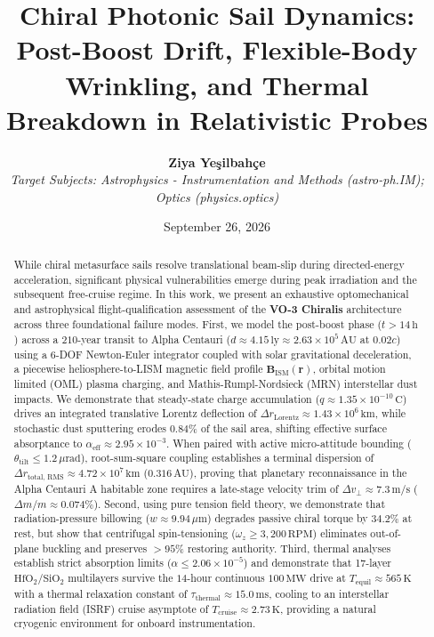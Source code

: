 \documentclass[11pt, a4paper]{article}
\title{\textbf{\LARGE Chiral Photonic Sail Dynamics: Post-Boost Drift, Flexible-Body Wrinkling, and Thermal Breakdown in Relativistic Probes}}
\author{\textbf{Ziya Ye\c{s}ilbah\c{c}e} \\
\textit{Target Subjects: Astrophysics - Instrumentation and Methods (astro-ph.IM); Optics (physics.optics)}}
\date{September 26, 2026}
\begin{document}
\maketitle

\begin{abstract}
While chiral metasurface sails resolve translational beam-slip during directed-energy acceleration, significant physical vulnerabilities emerge during peak irradiation and the subsequent free-cruise regime. In this work, we present an exhaustive optomechanical and astrophysical flight-qualification assessment of the \textbf{VO-3 Chiralis} architecture across three foundational failure modes. First, we model the post-boost phase ($t > 14\,\text{h}$) across a $210$-year transit to Alpha Centauri ($d \approx 4.15\,\text{ly} \approx 2.63 \times 10^5\,\text{AU}$ at $0.02c$) using a 6-DOF Newton-Euler integrator coupled with solar gravitational deceleration, a piecewise heliosphere-to-LISM magnetic field profile $\mathbf{B}_{\text{ISM}}(\mathbf{r})$, orbital motion limited (OML) plasma charging, and Mathis-Rumpl-Nordsieck (MRN) interstellar dust impacts. We demonstrate that steady-state charge accumulation ($q \approx 1.35 \times 10^{-10}\,\text{C}$) drives an integrated translative Lorentz deflection of $\Delta r_{\text{Lorentz}} \approx 1.43 \times 10^6\,\text{km}$, while stochastic dust sputtering erodes $0.84\%$ of the sail area, shifting effective surface absorptance to $\alpha_{\text{eff}} \approx 2.95 \times 10^{-3}$. When paired with active micro-attitude bounding ($\theta_{\text{tilt}} \le 1.2\,\mu\text{rad}$), root-sum-square coupling establishes a terminal dispersion of $\Delta r_{\text{total, RMS}} \approx 4.72 \times 10^7\,\text{km}$ ($0.316\,\text{AU}$), proving that planetary reconnaissance in the Alpha Centauri A habitable zone requires a late-stage velocity trim of $\Delta v_{\perp} \approx 7.3\,\text{m/s}$ ($\Delta m / m \approx 0.074\%$). Second, using pure tension field theory, we demonstrate that radiation-pressure billowing ($w \approx 9.94\,\mu\text{m}$) degrades passive chiral torque by $34.2\%$ at rest, but show that centrifugal spin-tensioning ($\omega_z \ge 3,200\,\text{RPM}$) eliminates out-of-plane buckling and preserves $>95\%$ restoring authority. Third, thermal analyses establish strict absorption limits ($\alpha \le 2.06 \times 10^{-5}$) and demonstrate that 17-layer $\text{HfO}_2/\text{SiO}_2$ multilayers survive the $14$-hour continuous $100\,\text{MW}$ drive at $T_{\text{equil}} \approx 565\,\text{K}$ with a thermal relaxation constant of $\tau_{\text{thermal}} \approx 15.0\,\text{ms}$, cooling to an interstellar radiation field (ISRF) cruise asymptote of $T_{\text{cruise}} \approx 2.73\,\text{K}$, providing a natural cryogenic environment for onboard instrumentation.
\end{abstract}
\end{document}
